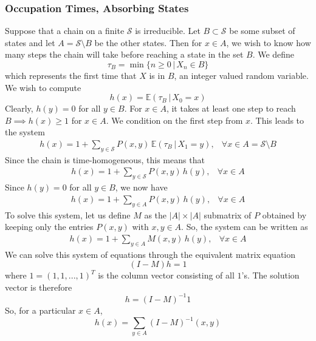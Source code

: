 \documentclass{article}
\theoremstyle{remark}
\theoremstyle{definition}
\begin{document}
\subsubsection{Occupation Times, Absorbing States}
Suppose that a chain on a finite $\mathcal{S}$ is irreducible. Let $B \subset \mathcal{S}$ be some subset of states and let $A = \mathcal{S} \setminus B$ be the other states. Then for $x \in A$, we wish to know how many steps the chain will take before reaching a state in the set $B$. We define 
\[\tau_B = \min\{n \geq 0 \,|\, X_n \in B\}\]
which represents the first time that $X$ is in $B$, an integer valued random variable. We wish to compute
\[h(x) = \mathbb{E}(\tau_B \,|\, X_0 = x)\]
Clearly, $h(y) = 0$ for all $y \in B$. For $x \in A$, it takes at least one step to reach $B \implies h(x) \geq 1$ for $x \in A$. We condition on the first step from $x$. This leads to the system \begin{align*}
    h(x) = 1 + \sum_{y \in \mathcal{S}} P(x, y) \, \mathbb{E}(\tau_B \,|\, X_1 = y), & \forall x \in A = \mathcal{S} \setminus B
\end{align*}
Since the chain is time-homogeneous, this means that
\begin{align*}
    h(x) = 1 + \sum_{y \in \mathcal{S}} P(x, y) \, h(y), & \forall x \in A 
\end{align*}
Since $h(y) = 0$ for all $y \in B$, we now have
\begin{align*}
    h(x) = 1 + \sum_{y \in A} P(x, y) \, h(y), & \forall x \in A 
\end{align*}
To solve this system, let us define $M$ as the $|A| \times |A|$ submatrix of $P$ obtained by keeping only the entries $P(x, y)$ with $x, y \in A$. So, the system can be written as
\begin{align*}
    h(x) = 1 + \sum_{y \in A} M(x, y) \, h(y), & \forall x \in A
\end{align*}
We can solve this system of equations through the equivalent matrix equation
\[(I - M) h = 1\]
where $1 = (1, 1, ..., 1)^T$ is the column vector consisting of all $1$'s. The solution vector is therefore
\[h = (I - M)^{-1} 1\]
So, for a particular $x \in A$, 
\[h(x) = \sum_{y \in A} (I - M)^{-1} (x, y)\]
\\
\end{document}
